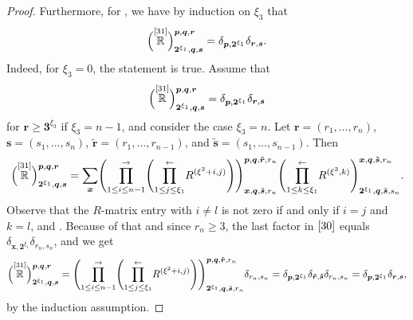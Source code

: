 \documentclass[10pt,a4paper]{amsart}
\numberwithin{equation}{section}
\begin{document}
\begin{proof}
Furthermore, for , we have by induction on $\xi_3$ that
\[
\Bigl(\overset{[31]}{\mathbb{R}} \Big)^{\boldsymbol{p},\boldsymbol{q},\boldsymbol{r}}_{\boldsymbol{2}^{\xi_1}, \boldsymbol{q},\boldsymbol{s}}=\delta_{\boldsymbol{p},\boldsymbol{2}^{\xi_1}} \delta_{\boldsymbol{r},\boldsymbol{s}}.
\]
Indeed, for $\xi_3=0$, the statement is true. Assume that
\[
\Bigl(\overset{[31]}{\mathbb{R}} \Big)^{\boldsymbol{p},\boldsymbol{q},\boldsymbol{r}}_{\boldsymbol{2}^{\xi_1},\boldsymbol{q},\boldsymbol{s}}=\delta_{\boldsymbol{p}, \boldsymbol{2}^{\xi_1}} \delta_{\boldsymbol{r},\boldsymbol{s}}
\]
for $\boldsymbol{r}\geq \boldsymbol {3}^{\xi_3}$ if $\xi_3=n-1$, and consider the case $\xi_3=n$.
Let $\boldsymbol{r}=(r_1,\dots,r_n)$, $\boldsymbol{s}=(s_1,\dots,s_n)$, $\tilde{\boldsymbol{r}}=(r_1,\dots,r_{n-1})$, and $\tilde{\boldsymbol{s}}=(s_1,\dots,s_{n-1})$. Then
\begin{equation}\label{30}
\Bigl(\overset{[31]}{\mathbb{R}} \Big)^{\boldsymbol{p},\boldsymbol{q},\boldsymbol{r}}_{\boldsymbol{2}^{\xi_1},\boldsymbol{q},\boldsymbol{s}}=\sum_{\boldsymbol{x}}
\Biggl( \overset{\rightarrow}{\prod\limits_{1\leq i\leq n-1}} \Biggl( \overset{\leftarrow}{\prod\limits_{1\leq j\leq \xi_1}} R^{(\xi^2+i,j)} \Biggr)\Biggr)^{\boldsymbol{p},\boldsymbol{q},\tilde{\boldsymbol{r}},r_n}_{\boldsymbol{x},\boldsymbol{q},\tilde{\boldsymbol{s}},r_n}
\Biggl( \overset{\leftarrow}{\prod\limits_{1\leq k\leq \xi_1}}R^{( \xi^3,k)}\Biggr)^{\boldsymbol{x},\boldsymbol{q},\tilde{\boldsymbol{s}},r_n}_{\boldsymbol{2}^{\xi_1},\boldsymbol{q},\tilde{\boldsymbol{s}},s_n}.
\end{equation}
Observe that the $R$-matrix entry  with $i\neq l$ is not zero if and only if $i=j$ and $k=l$, and . Because of that and since $r_n\geq 3$, the last factor  in $\eqref{30}$ equals $\delta_{\boldsymbol{x},\boldsymbol{2}^{\xi_1}} \delta_{r_n,s_n}$, and we get
\begin{equation*}%
\Bigl(\overset{[31]}{\mathbb{R}} \Big)^{\boldsymbol{p},\boldsymbol{q},\boldsymbol{r}}_{\boldsymbol{2}^{\xi_1},\boldsymbol{q},\boldsymbol{s}}=
\Biggl( \overset{\rightarrow}{\prod\limits_{1\leq i\leq n-1}} \Bigg(\overset{\leftarrow}{\prod\limits_{1\leq j\leq \xi_1}}R^{(\xi^2+i,j)} \Bigg)\Biggr)^{\boldsymbol{p},\boldsymbol{q},\tilde{\boldsymbol{r}},r_n}_{\boldsymbol{2}^{\xi_1},\boldsymbol{q},\tilde{\boldsymbol{s}},r_n}\delta_{r_n,s_n}
= \delta_{\boldsymbol{p},\boldsymbol{2}^{\xi_1}} \delta_{\boldsymbol{\tilde{r}},\boldsymbol{\tilde{s}}} \delta_{r_n,s_n}
= \delta_{\boldsymbol{p},\boldsymbol{2}^{\xi_1}} \delta_{\boldsymbol{{r}},\boldsymbol{{s}}},
\end{equation*}
by the induction assumption.


\end{proof}
\end{document}
